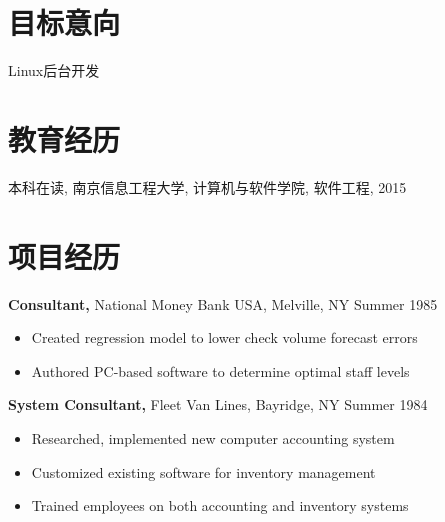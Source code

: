 \documentclass[margin]{res}
\begin{document}
 
     
     
    \address{{\bf 联系方式} \\ QQ:2586193965 \\ Email:2586193965@qq.com  \\
            tel:18752066262 }
     
    \begin{resume} 
     
    \section{目标意向} 
    Linux后台开发
    
    \section{教育经历} 
    本科在读, 南京信息工程大学, 计算机与软件学院, 软件工程, 2015 
     
    
    \section{项目经历}
     {\bf Consultant,} National Money Bank USA, Melville, NY \hfill Summer  1985
     \begin{itemize} \itemsep -2pt  %
     \item Created regression model to lower check volume 
                     forecast errors
     \item Authored PC-based software to determine optimal 
                     staff levels 
     \end{itemize}
    
     
     
    {\bf System Consultant,} Fleet Van Lines, Bayridge, NY \hfill  Summer 1984
    \begin{itemize} \itemsep -2pt %
    \item Researched, implemented new computer accounting 
                     system 
    \item Customized existing software for inventory 
                     management 
    \item Trained employees on both accounting and inventory 
                     systems 
    \end{itemize}
    

\end{resume}
\end{document}
